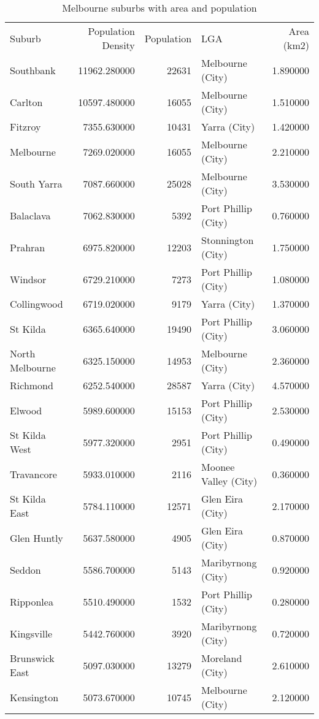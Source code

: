 \begin{table}
\caption{Melbourne suburbs with area and population}
\label{tab:mel_subs}
\begin{tabular}{lrrlr}
Suburb & Population Density & Population & LGA & Area (km2) \\
Southbank & 11962.280000 & 22631 & Melbourne (City) & 1.890000 \\
Carlton & 10597.480000 & 16055 & Melbourne (City) & 1.510000 \\
Fitzroy & 7355.630000 & 10431 & Yarra (City) & 1.420000 \\
Melbourne & 7269.020000 & 16055 & Melbourne (City) & 2.210000 \\
South Yarra & 7087.660000 & 25028 & Melbourne (City) & 3.530000 \\
Balaclava & 7062.830000 & 5392 & Port Phillip (City) & 0.760000 \\
Prahran & 6975.820000 & 12203 & Stonnington (City) & 1.750000 \\
Windsor & 6729.210000 & 7273 & Port Phillip (City) & 1.080000 \\
Collingwood & 6719.020000 & 9179 & Yarra (City) & 1.370000 \\
St Kilda & 6365.640000 & 19490 & Port Phillip (City) & 3.060000 \\
North Melbourne & 6325.150000 & 14953 & Melbourne (City) & 2.360000 \\
Richmond & 6252.540000 & 28587 & Yarra (City) & 4.570000 \\
Elwood & 5989.600000 & 15153 & Port Phillip (City) & 2.530000 \\
St Kilda West & 5977.320000 & 2951 & Port Phillip (City) & 0.490000 \\
Travancore & 5933.010000 & 2116 & Moonee Valley (City) & 0.360000 \\
St Kilda East & 5784.110000 & 12571 & Glen Eira (City) & 2.170000 \\
Glen Huntly & 5637.580000 & 4905 & Glen Eira (City) & 0.870000 \\
Seddon & 5586.700000 & 5143 & Maribyrnong (City) & 0.920000 \\
Ripponlea & 5510.490000 & 1532 & Port Phillip (City) & 0.280000 \\
Kingsville & 5442.760000 & 3920 & Maribyrnong (City) & 0.720000 \\
Brunswick East & 5097.030000 & 13279 & Moreland (City) & 2.610000 \\
Kensington & 5073.670000 & 10745 & Melbourne (City) & 2.120000 \\

\end{tabular}
\end{table}
